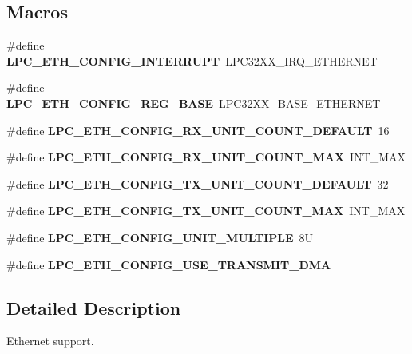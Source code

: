 \subsection*{Macros}
\begin{DoxyCompactItemize}
\item 
\mbox{\label{group__lpc__eth_ga8a164ecfd413f0040e45e089b5b6f4e3}} 
\#define {\bfseries L\+P\+C\+\_\+\+E\+T\+H\+\_\+\+C\+O\+N\+F\+I\+G\+\_\+\+I\+N\+T\+E\+R\+R\+U\+PT}~L\+P\+C32\+X\+X\+\_\+\+I\+R\+Q\+\_\+\+E\+T\+H\+E\+R\+N\+ET
\item 
\mbox{\label{group__lpc__eth_gaf330255f00e038cdc0a45e39c5128667}} 
\#define {\bfseries L\+P\+C\+\_\+\+E\+T\+H\+\_\+\+C\+O\+N\+F\+I\+G\+\_\+\+R\+E\+G\+\_\+\+B\+A\+SE}~L\+P\+C32\+X\+X\+\_\+\+B\+A\+S\+E\+\_\+\+E\+T\+H\+E\+R\+N\+ET
\item 
\mbox{\label{group__lpc__eth_ga5abced149c27528aa2c496a5357e2083}} 
\#define {\bfseries L\+P\+C\+\_\+\+E\+T\+H\+\_\+\+C\+O\+N\+F\+I\+G\+\_\+\+R\+X\+\_\+\+U\+N\+I\+T\+\_\+\+C\+O\+U\+N\+T\+\_\+\+D\+E\+F\+A\+U\+LT}~16
\item 
\mbox{\label{group__lpc__eth_ga1f76684f0688dfddd706ea14b4fd43dc}} 
\#define {\bfseries L\+P\+C\+\_\+\+E\+T\+H\+\_\+\+C\+O\+N\+F\+I\+G\+\_\+\+R\+X\+\_\+\+U\+N\+I\+T\+\_\+\+C\+O\+U\+N\+T\+\_\+\+M\+AX}~I\+N\+T\+\_\+\+M\+AX
\item 
\mbox{\label{group__lpc__eth_gad64c8b27013b429a660a61789a166f7d}} 
\#define {\bfseries L\+P\+C\+\_\+\+E\+T\+H\+\_\+\+C\+O\+N\+F\+I\+G\+\_\+\+T\+X\+\_\+\+U\+N\+I\+T\+\_\+\+C\+O\+U\+N\+T\+\_\+\+D\+E\+F\+A\+U\+LT}~32
\item 
\mbox{\label{group__lpc__eth_gaee16a5d417297e53eff0762cea2dffbf}} 
\#define {\bfseries L\+P\+C\+\_\+\+E\+T\+H\+\_\+\+C\+O\+N\+F\+I\+G\+\_\+\+T\+X\+\_\+\+U\+N\+I\+T\+\_\+\+C\+O\+U\+N\+T\+\_\+\+M\+AX}~I\+N\+T\+\_\+\+M\+AX
\item 
\mbox{\label{group__lpc__eth_gabeebe4c2131ca732ee4852c5a9891d58}} 
\#define {\bfseries L\+P\+C\+\_\+\+E\+T\+H\+\_\+\+C\+O\+N\+F\+I\+G\+\_\+\+U\+N\+I\+T\+\_\+\+M\+U\+L\+T\+I\+P\+LE}~8U
\item 
\mbox{\label{group__lpc__eth_ga83c865183f8f38ee3d081084d3b37cb0}} 
\#define {\bfseries L\+P\+C\+\_\+\+E\+T\+H\+\_\+\+C\+O\+N\+F\+I\+G\+\_\+\+U\+S\+E\+\_\+\+T\+R\+A\+N\+S\+M\+I\+T\+\_\+\+D\+MA}
\end{DoxyCompactItemize}


\subsection{Detailed Description}
Ethernet support. 

